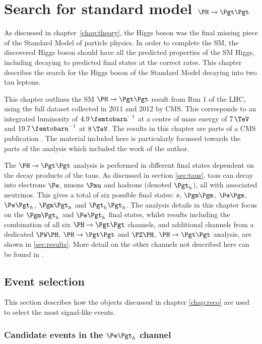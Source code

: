 \chapter{Search for standard model $\PH \to \Pgt\Pgt$}
\label{chap:htt-sm}

As discussed in chapter~\ref{chap:theory}, the Higgs boson was the final missing 
piece of the Standard Model of particle physics. In order to complete the
\ac{SM}, the discovered Higgs boson should have all the predicted properties of the
\ac{SM} Higgs, including decaying to predicted final states at the correct rates. This
chapter describes the search for the Higgs boson of the Standard Model 
decaying into two tau leptons.

This chapter outlines the \ac{SM} $\HToTauTau$ result from Run 1 of the LHC, using the
full dataset collected in 2011 and 2012 by CMS. This corresponds to an
integrated luminosity of $4.9\,\femtobarn^{-1}$ at a centre of mass energy of $7\,\TeV$ and
$19.7\,\femtobarn^{-1}$ at $8\,\TeV$. The results in this chapter are parts of a CMS publication 
\cite{HIG-13-004}. The material included 
here is particularly focussed towards the parts of the analysis which 
included the work of the author. 

The $\HToTauTau$ analysis is performed in different final states dependent
on the decay products of the taus. As discussed in section
\ref{sec:taus}, taus can decay into electrons $\Pe$,
muons $\Pmu$ and hadrons (denoted $\Pgth$), all with associated neutrinos.
This gives a total of six possible final states: $\ee$, $\mumu$, $\emu$,
$\etau$, $\mutau$ and $\tautau$. The analysis details in this chapter focus on
the $\mutau$ and $\etau$ final states, whilst results including the combination of all
six $\HToTauTau$ channels, and additional channels from a dedicated $\PW\PH$, $\PH\to\Pgt\Pgt$ and
$\PZ\PH$, $\PH\to\Pgt\Pgt$ analysis, are shown in \ref{sec:results}. More detail on the other channels
not described here can be found in \cite{HIG-13-004}. 

\section{Event selection}
\label{sec:eventSelection}

This section describes how the objects discussed in chapter
\ref{chap:reco} are used to select the most signal-like events. 

\subsection{Candidate events in the $\etau$ channel}

